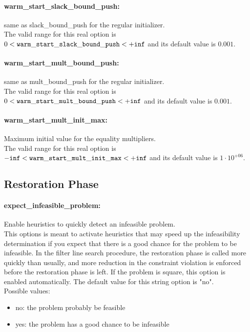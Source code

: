 \paragraph{warm\_start\_slack\_bound\_push:}\label{opt:warm_start_slack_bound_push} same as slack\_bound\_push for the regular initializer. \\
 The valid range for this real option is 
$0 <  {\tt warm\_start\_slack\_bound\_push } <  {\tt +inf}$
and its default value is $0.001$.


\paragraph{warm\_start\_mult\_bound\_push:}\label{opt:warm_start_mult_bound_push} same as mult\_bound\_push for the regular initializer. \\
 The valid range for this real option is 
$0 <  {\tt warm\_start\_mult\_bound\_push } <  {\tt +inf}$
and its default value is $0.001$.


\paragraph{warm\_start\_mult\_init\_max:}\label{opt:warm_start_mult_init_max} Maximum initial value for the equality multipliers. \\
 The valid range for this real option is 
${\tt -inf} <  {\tt warm\_start\_mult\_init\_max } <  {\tt +inf}$
and its default value is $1 \cdot 10^{+06}$.


\subsection{Restoration Phase}

\paragraph{expect\_infeasible\_problem:}\label{opt:expect_infeasible_problem} Enable heuristics to quickly detect an infeasible problem. \\
 This options is meant to activate heuristics that may speed up the infeasibility determination if you expect that there is a good chance for the problem to be infeasible.  In the filter line search procedure, the restoration phase is called more quickly than usually, and more reduction in the constraint violation is enforced before the restoration phase is left. If the problem is square, this option is enabled automatically. The default value for this string option is "no".
\\ 
Possible values:
\begin{itemize}
   \item no: the problem probably be feasible
   \item yes: the problem has a good chance to be infeasible
\end{itemize}

